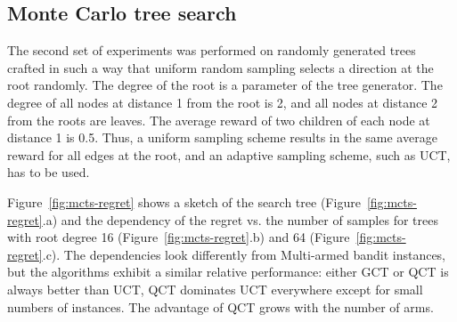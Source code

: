 \documentclass{article}
\begin{document}
\subsection{Monte Carlo tree search}
\label{sec:emp-mcts}

The second set of experiments was performed on randomly generated
trees crafted in such a way that uniform random sampling selects a
direction at the root randomly. The degree of the root is a parameter of
the tree generator. The degree of all nodes at distance 1 from the
root is 2, and all nodes at distance 2 from the roots are leaves. The
average reward of two children of each node at distance 1 is
0.5. Thus, a uniform sampling scheme results in the same average reward for
all edges at the root, and an adaptive sampling scheme, such as UCT,
has to be used.

Figure~\ref{fig:mcts-regret} shows a sketch of the search tree
(Figure~\ref{fig:mcts-regret}.a) and the dependency of the regret vs. the
number of samples for trees with root degree 16
(Figure~\ref{fig:mcts-regret}.b) and 64 (Figure~\ref{fig:mcts-regret}.c). The
dependencies look differently from Multi-armed bandit instances, but
the algorithms exhibit a similar relative performance: either GCT or QCT
is always better than UCT, QCT dominates UCT everywhere
except for small numbers of instances. The advantage of QCT grows with
the number of arms.
\end{document}
